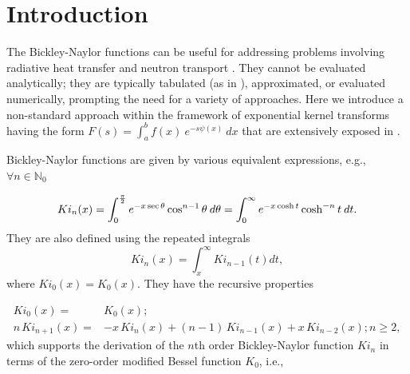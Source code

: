 \documentclass[pdflatex,sn-mathphys-num]{sn-jnl}%
\theoremstyle{thmstyleone}%
\theoremstyle{thmstyletwo}%
\theoremstyle{thmstylethree}%
\begin{document}


\maketitle

\section{Introduction}

The Bickley-Naylor functions \cite{bickley1935} can be useful for addressing problems involving radiative heat transfer \cite{Altaç1996, Wang, Djeumegni} and neutron transport \cite{lewismiller}. They cannot be evaluated analytically; they are typically tabulated (as in \cite{bickley1935}), approximated, or evaluated numerically, prompting the need for a variety of approaches. Here we introduce a non-standard approach within the framework of exponential kernel transforms having the form $F(s)=\int_a^b f(x) \:e^{-s\psi(x)}\: dx$ that are extensively exposed in \cite{Ruffa2022,Ruffa2024}.

Bickley-Naylor functions are given by various equivalent expressions, e.g., 
$\forall n\in\mathbb{N}_0$

\begin{equation}
Ki_n(x)
= \int_0^{\frac{\pi}{2}} e^{-x\sec\theta} \cos^{n-1}\theta \:d\theta\\
= \int_0^{\infty} e^{-x\cosh t} \cosh^{-n} t \:dt.
\end{equation}
They are also defined using the repeated integrals
\begin{equation}
    Ki_n(x)=\int_x^\infty Ki_{n-1}(t) dt,
\end{equation}
where $Ki_0(x) = K_0(x).$ They have the recursive properties \cite{Abramowitz}

\begin{equation}
\begin{split}
Ki_0(x)= & K_0(x);\\
n\,Ki_{n+1}(x) = & -x\,Ki_n(x) + (n-1)\,Ki_{n-1}(x) + x\,Ki_{n-2}(x); n\ge 2,
\label{RR}
\end{split}
\end{equation} 
which supports the derivation of the $n$th order Bickley-Naylor function $Ki_n$ in terms of the zero-order modified Bessel function $K_0$, i.e.,
\end{document}
